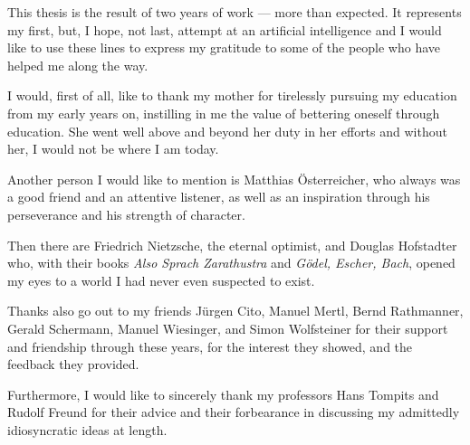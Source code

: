 \documentclass[draft,final]{vutinfth}
\begin{document}
    
    \stdlisting
	
	\frontmatter %
	
	\addstatementpage
	
	\begin{acknowledgements*}
		This thesis is the result of two years of work --- more than expected. It represents my first, but, I hope, not last, attempt at an artificial intelligence and I would like to use these lines to express my gratitude to some of the people who have helped me along the way.
		
		I would, first of all, like to thank my mother for tirelessly pursuing my education from my early years on, instilling in me the value of bettering oneself through education. She went well above and beyond her duty in her efforts and without her, I would not be where I am today.
		
		Another person I would like to mention is Matthias \"{O}sterreicher, who always was a good friend and an attentive listener, as well as an inspiration through his perseverance and his strength of character.
		
		Then there are Friedrich Nietzsche, the eternal optimist, and Douglas Hofstadter who, with their books \emph{Also Sprach Zarathustra} and \emph{G\"{o}del, Escher, Bach}, opened my eyes to a world I had never even suspected to exist.
		
		Thanks also go out to my friends J\"{u}rgen Cito, Manuel Mertl, Bernd Rathmanner, Gerald Schermann, Manuel Wiesinger, and Simon Wolfsteiner for their support and friendship through these years, for the interest they showed, and the feedback they provided.
		
		Furthermore, I would like to sincerely thank my professors Hans Tompits and Rudolf Freund for their advice and their forbearance in discussing my admittedly idiosyncratic ideas at length.
	\end{acknowledgements*}
	
\end{document}
